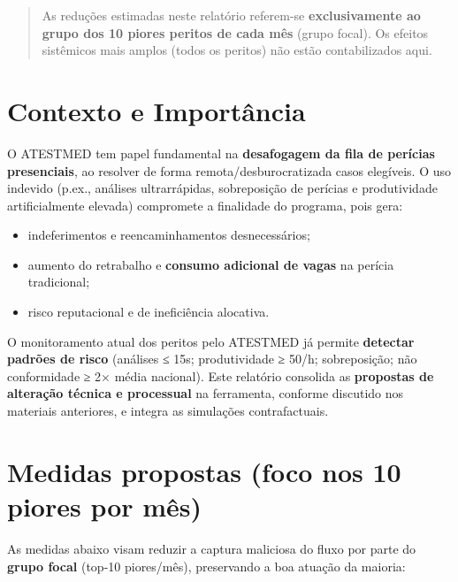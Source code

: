 \documentclass[11pt]{article}
\begin{document}
\begin{quote}
As reduções estimadas neste relatório referem-se \textbf{\textbf{exclusivamente ao grupo dos 10 piores peritos de cada mês}} (grupo focal). Os efeitos sistêmicos mais amplos (todos os peritos) não estão contabilizados aqui.
\end{quote}

\section{Contexto e Importância}
\label{sec:orge8e54f9}
O ATESTMED tem papel fundamental na \textbf{desafogagem da fila de perícias presenciais}, ao resolver de forma remota/desburocratizada casos elegíveis. O uso indevido (p.ex., análises ultrarrápidas, sobreposição de perícias e produtividade artificialmente elevada) compromete a finalidade do programa, pois gera:
\begin{itemize}
\item indeferimentos e reencaminhamentos desnecessários;
\item aumento do retrabalho e \textbf{consumo adicional de vagas} na perícia tradicional;
\item risco reputacional e de ineficiência alocativa.
\end{itemize}

O monitoramento atual dos peritos pelo ATESTMED já permite \textbf{detectar padrões de risco} (análises ≤ 15s; produtividade ≥ 50/h; sobreposição; não conformidade ≥ 2× média nacional). Este relatório consolida as \textbf{propostas de alteração técnica e processual} na ferramenta, conforme discutido nos materiais anteriores, e integra as simulações contrafactuais.

\section{Medidas propostas (foco nos 10 piores por mês)}
\label{sec:org7eff1ec}
As medidas abaixo visam reduzir a captura maliciosa do fluxo por parte do \textbf{grupo focal} (top-10 piores/mês), preservando a boa atuação da maioria:
\end{document}
